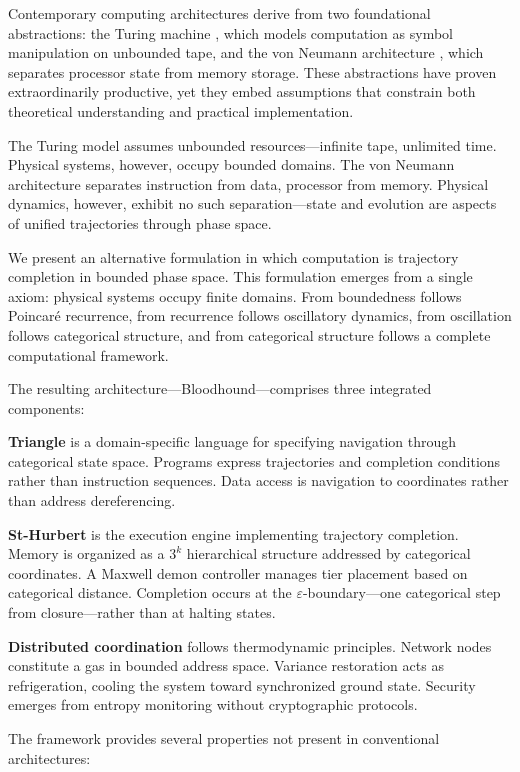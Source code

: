 \documentclass[10pt,twocolumn]{article}
\theoremstyle{definition}
\theoremstyle{remark}
\begin{document}
Contemporary computing architectures derive from two foundational abstractions: the Turing machine \cite{turing1936}, which models computation as symbol manipulation on unbounded tape, and the von Neumann architecture \cite{vonneumann1945}, which separates processor state from memory storage. These abstractions have proven extraordinarily productive, yet they embed assumptions that constrain both theoretical understanding and practical implementation.

The Turing model assumes unbounded resources---infinite tape, unlimited time. Physical systems, however, occupy bounded domains. The von Neumann architecture separates instruction from data, processor from memory. Physical dynamics, however, exhibit no such separation---state and evolution are aspects of unified trajectories through phase space.

We present an alternative formulation in which computation is trajectory completion in bounded phase space. This formulation emerges from a single axiom: physical systems occupy finite domains. From boundedness follows Poincar\'{e} recurrence, from recurrence follows oscillatory dynamics, from oscillation follows categorical structure, and from categorical structure follows a complete computational framework.

The resulting architecture---Bloodhound---comprises three integrated components:

\textbf{Triangle} is a domain-specific language for specifying navigation through categorical state space. Programs express trajectories and completion conditions rather than instruction sequences. Data access is navigation to coordinates rather than address dereferencing.

\textbf{St-Hurbert} is the execution engine implementing trajectory completion. Memory is organized as a $3^k$ hierarchical structure addressed by categorical coordinates. A Maxwell demon controller manages tier placement based on categorical distance. Completion occurs at the $\varepsilon$-boundary---one categorical step from closure---rather than at halting states.

\textbf{Distributed coordination} follows thermodynamic principles. Network nodes constitute a gas in bounded address space. Variance restoration acts as refrigeration, cooling the system toward synchronized ground state. Security emerges from entropy monitoring without cryptographic protocols.

The framework provides several properties not present in conventional architectures:
\end{document}
